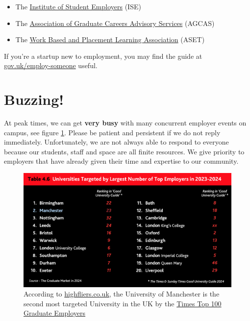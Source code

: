 \documentclass[
  12pt,
]{book}
\providecommand{\tightlist}{%
  \setlength{\itemsep}{0pt}\setlength{\parskip}{0pt}}
\begin{document}
\begin{itemize}
\tightlist
\item
  The \href{https://ise.org.uk/}{Institute of Student Employers} (ISE)
\item
  The \href{https://www.agcas.org.uk}{Association of Graduate Careers Advisory Services} (AGCAS)
\item
  The \href{https://www.asetonline.org}{Work Based and Placement Learning Association} (ASET)
\end{itemize}

If you're a startup new to employment, you may find the guide at \href{https://www.gov.uk/employ-someone}{gov.uk/employ-someone} useful.

\hypertarget{buzzing}{%
\section{Buzzing!}\label{buzzing}}

At peak times, we can get \textbf{very busy} with many concurrent employer events on campus, see figure \ref{fig:busy-fig}. Please be patient and persistent if we do not reply immediately. Unfortunately, we are not always able to respond to everyone because our students, staff and space are all finite resources. We give priority to employers that have already given their time and expertise to our community.



\begin{figure}

{\centering \includegraphics[width=1\linewidth]{images/high-fliers-table-2024} 

}

\caption{According to \href{https://www.highfliers.co.uk}{highfliers.co.uk}, the University of Manchester is the second most targeted University in the UK by the \href{https://www.top100graduateemployers.com}{Times Top 100 Graduate Employers} \citep{highfliers2024}}\label{fig:busy-fig}
\end{figure}
\end{document}
